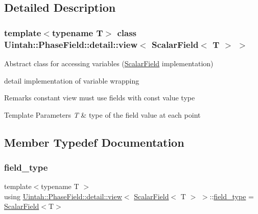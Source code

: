 \subsection{Detailed Description}
\subsubsection*{template$<$typename T$>$\newline
class Uintah\+::\+Phase\+Field\+::detail\+::view$<$ Scalar\+Field$<$ T $>$ $>$}

Abstract class for accessing variables (\hyperlink{structUintah_1_1PhaseField_1_1ScalarField}{Scalar\+Field} implementation) 

detail implementation of variable wrapping

\begin{DoxyRemark}{Remarks}
constant view must use fields with const value type
\end{DoxyRemark}

\begin{DoxyTemplParams}{Template Parameters}
{\em T} & type of the field value at each point \\
\hline
\end{DoxyTemplParams}


\subsection{Member Typedef Documentation}
\mbox{\label{classUintah_1_1PhaseField_1_1detail_1_1view_3_01ScalarField_3_01T_01_4_01_4_adfcfd1565ea23262122c7e6357e15bb0}} 
\subsubsection{\texorpdfstring{field\+\_\+type}{field\_type}}
{\footnotesize\ttfamily template$<$typename T $>$ \\
using \hyperlink{classUintah_1_1PhaseField_1_1detail_1_1view}{Uintah\+::\+Phase\+Field\+::detail\+::view}$<$ \hyperlink{structUintah_1_1PhaseField_1_1ScalarField}{Scalar\+Field}$<$ T $>$ $>$\+::\hyperlink{classUintah_1_1PhaseField_1_1detail_1_1view_3_01ScalarField_3_01T_01_4_01_4_adfcfd1565ea23262122c7e6357e15bb0}{field\+\_\+type} =  \hyperlink{structUintah_1_1PhaseField_1_1ScalarField}{Scalar\+Field}$<$T$>$}



